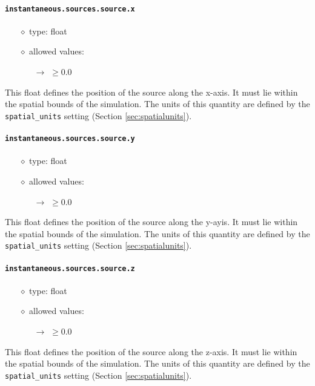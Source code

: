 \documentclass[]{article}
\def\code#1{\texttt{#1}}
\begin{document}
\paragraph{\code{instantaneous.sources.source.x}}\label{sec:instsourcex}
\begin{itemize}
    \item[$\diamond$] type: float 
    \item[$\diamond$] allowed values:
    \begin{itemize}
        \item[$\rightarrow$] $\geq0.0$
    \end{itemize}
\end{itemize}
This float defines the position of the source along the x-axis. It must lie
within the spatial bounds of the simulation. The units of this quantity are
defined by the \code{spatial\_units} setting (Section \ref{sec:spatialunits}).

\paragraph{\code{instantaneous.sources.source.y}}\label{sec:instsourcey}
\begin{itemize}
    \item[$\diamond$] type: float 
    \item[$\diamond$] allowed values:
    \begin{itemize}
        \item[$\rightarrow$] $\geq0.0$
    \end{itemize}
\end{itemize}
This float defines the position of the source along the y-ayis. It must lie
within the spatial bounds of the simulation. The units of this quantity are
defined by the \code{spatial\_units} setting (Section \ref{sec:spatialunits}).

\paragraph{\code{instantaneous.sources.source.z}}\label{sec:instsourcez}
\begin{itemize}
    \item[$\diamond$] type: float 
    \item[$\diamond$] allowed values:
    \begin{itemize}
        \item[$\rightarrow$] $\geq0.0$
    \end{itemize}
\end{itemize}
This float defines the position of the source along the z-axis. It must lie
within the spatial bounds of the simulation. The units of this quantity are
defined by the \code{spatial\_units} setting (Section \ref{sec:spatialunits}).
\end{document}
